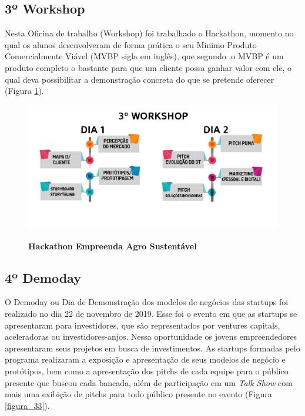 \subsection{3º Workshop}
 
Nesta Oficina de trabalho (Workshop) foi trabalhado o Hackathon, momento no qual os alunos desenvolveram de forma prática o seu Mínimo Produto Comercialmente Viável (MVBP sigla em inglês), que segundo .o MVBP é um produto completo o bastante para que um cliente possa ganhar valor com ele, o qual deva possibilitar a demonstração concreta do que se pretende oferecer (Figura \ref{figura_32}).

\begin{figure}[H]
\centering
\caption{\textbf{Hackathon Empreenda Agro Sustentável}}
\includegraphics[scale=0.45]{Imagens/workshop-03.png}
\label{figura_32}
\end{figure}

\subsection{4º Demoday}

O Demoday ou Dia de Demonstração dos modelos de negócios das startups foi realizado no dia 22 de novembro de 2019. Esse foi o evento em que as startups se apresentaram para investidores, que são representados por ventures capitals, aceleradoras ou investidores-anjos. Nessa oportunidade os jovens empreendedores apresentaram seus projetos em busca de investimentos. As startups formadas pelo programa realizaram a exposição e apresentação de seus modelos de negócio e protótipos, bem como a apresentação dos pitchs de cada equipe para o público presente que buscou cada bancada, além de participação em um \textit{Talk Show} com mais uma exibição de pitchs para todo público presente no evento (Figura \ref{figura_33}).

